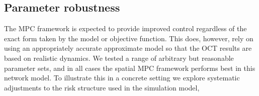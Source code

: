\subsection{Parameter robustness\label{sec:ch4:Results_ParameterRobustness}}

The MPC framework is expected to provide improved control regardless of the exact form taken by the model or objective function. This does, however, rely on using an appropriately accurate approximate model so that the OCT results are based on realistic dynamics. We tested a range of arbitrary but reasonable parameter sets, and in all cases the spatial MPC framework performs best in this network model. To illustrate this in a concrete setting we explore systematic adjustments to the risk structure used in the simulation model, 


